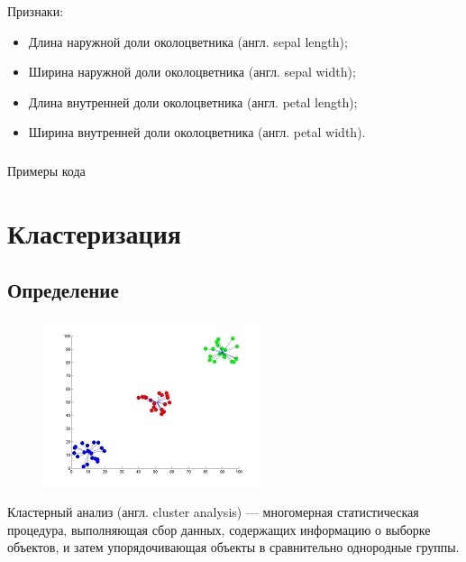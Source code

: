 \documentclass[t,aspectratio=169]{beamer}  %
\begin{document}
\begin{frame}
    \frametitle{\insertsection} 
    \framesubtitle{\insertsubsection}
    Признаки:
    \begin{itemize}
        \item Длина наружной доли околоцветника (англ. sepal length);
        \item Ширина наружной доли околоцветника (англ. sepal width);
        \item Длина внутренней доли околоцветника (англ. petal length);
        \item Ширина внутренней доли околоцветника (англ. petal width).
    \end{itemize}
\end{frame}

\begin{frame}[plain,c]
    \frametitle{\insertsection} 
    \framesubtitle{\insertsubsection}
    \begin{center}
        \huge Примеры кода
    \end{center}
\end{frame}

\section{Кластеризация}
\subsection{Определение}

\begin{frame}
    \frametitle{\insertsection} 
    \framesubtitle{\insertsubsection}    
    \begin{figure}
        \vspace{-0.5cm}
        \includegraphics[width=\linewidth]{k-means.jpg}
    \end{figure}
    Кластерный анализ (англ. cluster analysis) — многомерная статистическая процедура, выполняющая сбор данных, содержащих информацию о выборке объектов, и затем упорядочивающая объекты в сравнительно однородные группы.\cite{wiki:clustering_def}
\end{frame}
\end{document}
